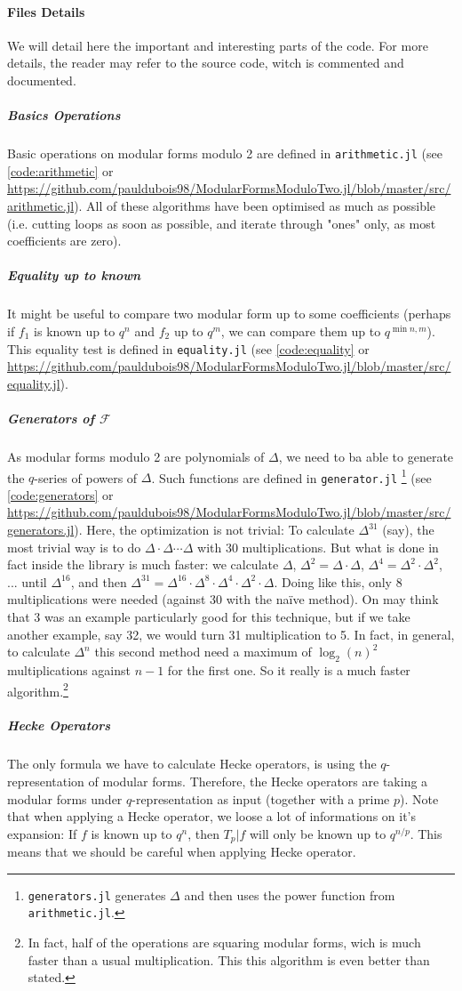 \paragraph{Files Details}
We will detail here the important and interesting parts of the code.
For more details, the reader may refer to the source code, witch is commented and documented.
\subparagraph{Basics Operations}
Basic operations on modular forms modulo 2 are defined in \texttt{arithmetic.jl} (see \ref{code:arithmetic} or \url{https://github.com/pauldubois98/ModularFormsModuloTwo.jl/blob/master/src/arithmetic.jl}).
All of these algorithms have been optimised as much as possible (i.e. cutting loops as soon as possible, and iterate through "ones" only, as most coefficients are zero).
\subparagraph{Equality up to known}
It might be useful to compare two modular form up to some coefficients (perhaps if $f_1$ is known up to $q^n$ and $f_2$ up to $q^m$, we can compare them up to $q^{\min{n,m}}$).
This equality test is defined in \texttt{equality.jl} (see \ref{code:equality} or \url{https://github.com/pauldubois98/ModularFormsModuloTwo.jl/blob/master/src/equality.jl}).
\subparagraph{Generators of $\mathcal{F}$}
As modular forms modulo 2 are polynomials of $\Delta$, we need to ba able to generate the $q$-series of powers of $\Delta$.
Such functions are defined in \texttt{generator.jl} \footnote{\texttt{generators.jl} generates $\Delta$ and then uses the power function from \texttt{arithmetic.jl}.} (see \ref{code:generators} or \url{https://github.com/pauldubois98/ModularFormsModuloTwo.jl/blob/master/src/generators.jl}).
Here, the optimization is not trivial:
To calculate $\Delta^{31}$ (say), the most trivial way is to do $\Delta \cdot \Delta \cdots \Delta$ with 30 multiplications.
But what is done in fact inside the library is much faster: we calculate $\Delta$, $\Delta^2 = \Delta \cdot \Delta$, $\Delta^4 = \Delta^2 \cdot \Delta^2$, ... until $\Delta^{16}$, and then $\Delta^{31} = \Delta^{16} \cdot \Delta^8 \cdot \Delta^4 \cdot \Delta^2 \cdot \Delta$.
Doing like this, only 8 multiplications were needed (against 30 with the naïve method).
On may think that 3 was an example particularly good for this technique, but if we take another example, say 32, we would turn 31 multiplication to 5.
In fact, in general, to calculate $\Delta^n$ this second method need a maximum of $\log_2(n)^2$ multiplications against $n-1$ for the first one.
So it really is a much faster algorithm.\footnote{In fact, half of the operations are squaring modular forms, wich is much faster than a usual multiplication. This this algorithm is even better than stated.}
\subparagraph{Hecke Operators}
The only formula we have to calculate Hecke operators, is using the $q$-representation of modular forms.
Therefore, the Hecke operators are taking a modular forms under $q$-representation as input (together with a prime $p$).
Note that when applying a Hecke operator, we loose a lot of informations on it's expansion:
If $f$ is known up to $q^n$, then $T_p|f$ will only be known up to $q^{n/p}$.
This means that we should be careful when applying Hecke operator.

